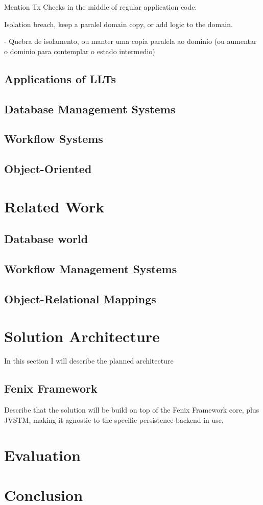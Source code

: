 \documentclass{llncs}
\begin{document}
Mention Tx Checks in the middle of regular application code.

Isolation breach, keep a paralel domain copy, or add logic to the
domain.

     - Quebra de isolamento, ou manter uma copia paralela ao dominio
     (ou aumentar o dominio para contemplar o estado intermedio)

\subsection{Applications of LLTs}

\subsection{Database Management Systems}

\subsection{Workflow Systems}

\subsection{Object-Oriented}

\section{Related Work}

\subsection{Database world}

\subsection{Workflow Management Systems}

\subsection{Object-Relational Mappings}

\section{Solution Architecture}

In this section I will describe the planned architecture 

\subsection{Fenix Framework}

Describe that the solution will be build on top of the Fenix Framework
core, plus JVSTM, making it agnostic to the specific persistence
backend in use. 

\section{Evaluation}

\section{Conclusion}



\end{document}
